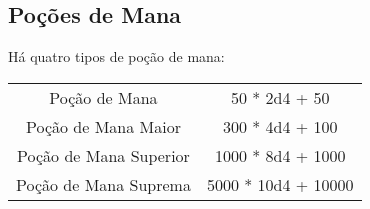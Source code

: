 \begin{multicols}{2}
\subsection{Poções de Mana}%
\label{sub:pocoes_de_mana}

Há quatro tipos de poção de mana:
\begin{tabular}{c c}
    Poção de Mana & 50 * 2d4 + 50 \\
    Poção de Mana Maior & 300 * 4d4 + 100 \\
    Poção de Mana Superior & 1000 * 8d4 + 1000 \\
    Poção de Mana Suprema & 5000 * 10d4 + 10000 \\
\end{tabular}

\end{multicols}

